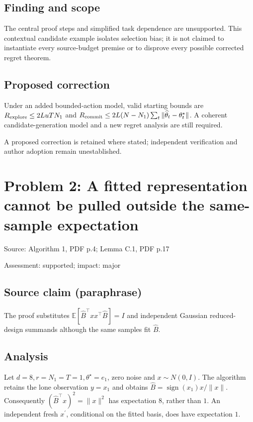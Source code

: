 \documentclass[11pt]{article}
\begin{document}
\subsection*{Finding and scope}

The central proof steps and simplified task dependence are unsupported. This contextual candidate example isolates selection bias; it is not claimed to instantiate every source-budget premise or to disprove every possible corrected regret theorem.

\subsection*{Proposed correction}

Under an added bounded-action model, valid starting bounds are \(R_{\rm explore}\le2LuTN_1\) and \(R_{\rm commit}\le2L(N-N_1)\sum_t\|\widehat\theta_t-\theta_t^\star\|\). A coherent candidate-generation model and a new regret analysis are still required.

A proposed correction is retained where stated; independent verification and author adoption remain unestablished.

\section*{Problem 2: A fitted representation cannot be pulled outside the same-sample expectation}

Source: Algorithm 1, PDF p.4; Lemma C.1, PDF p.17

Assessment: supported; impact: major

\subsection*{Source claim (paraphrase)}

The proof substitutes \(\mathbb E[\widehat B^\top xx^\top\widehat B]=I\) and independent Gaussian reduced-design summands although the same samples fit \(\widehat B\).

\subsection*{Analysis}

Let \(d=8,r=N_1=T=1,\theta^\star=e_1\), zero noise and \(x\sim N(0,I)\). The algorithm retains the lone observation \(y=x_1\) and obtains \(\widehat B=\operatorname{sign}(x_1)x/\|x\|\). Consequently \((\widehat B^\top x)^2=\|x\|^2\) has expectation \(8\), rather than \(1\). An independent fresh \(x^\prime\), conditional on the fitted basis, does have expectation \(1\).
\end{document}
